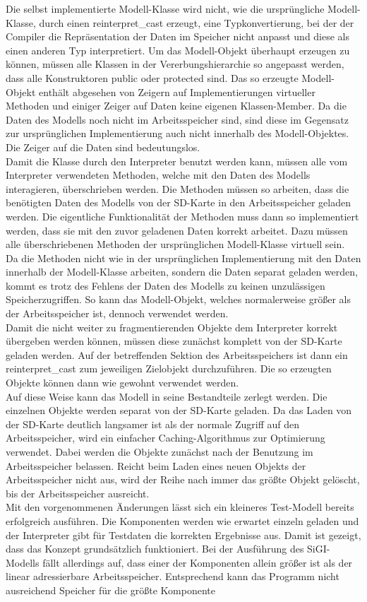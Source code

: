     Die selbst implementierte Modell-Klasse wird nicht, wie die ursprüngliche Modell-Klasse, durch einen reinterpret\_cast erzeugt, eine Typkonvertierung, bei der der Compiler die Repräsentation der Daten im Speicher nicht anpasst und diese als einen anderen Typ interpretiert. Um das Modell-Objekt überhaupt erzeugen zu können, müssen alle Klassen in der Vererbungshierarchie so angepasst werden, dass alle Konstruktoren public oder protected sind. Das so erzeugte Modell-Objekt enthält abgesehen von Zeigern auf Implementierungen virtueller Methoden und einiger Zeiger auf Daten keine eigenen Klassen-Member. Da die Daten des Modells noch nicht im Arbeitsspeicher sind, sind diese im Gegensatz zur ursprünglichen Implementierung auch nicht innerhalb des Modell-Objektes. Die Zeiger auf die Daten sind bedeutungslos.\\ Damit die Klasse durch den Interpreter benutzt werden kann, müssen alle vom Interpreter verwendeten Methoden, welche mit den Daten des Modells interagieren, überschrieben werden. Die Methoden müssen so arbeiten, dass die benötigten Daten des Modells von der SD-Karte in den Arbeitsspeicher geladen werden. Die eigentliche Funktionalität der Methoden muss dann so implementiert werden, dass sie mit den zuvor geladenen Daten korrekt arbeitet. Dazu müssen alle überschriebenen Methoden der ursprünglichen Modell-Klasse virtuell sein.\\ Da die Methoden nicht wie in der ursprünglichen Implementierung mit den Daten innerhalb der Modell-Klasse arbeiten, sondern die Daten separat geladen werden, kommt es trotz des Fehlens der Daten des Modells zu keinen unzulässigen Speicherzugriffen. So kann das Modell-Objekt, welches normalerweise größer als der Arbeitsspeicher ist, dennoch verwendet werden.\\ Damit die nicht weiter zu fragmentierenden Objekte dem Interpreter korrekt übergeben werden können, müssen diese zunächst komplett von der SD-Karte geladen werden. Auf der betreffenden Sektion des Arbeitsspeichers ist dann ein reinterpret\_cast zum jeweiligen Zielobjekt durchzuführen. Die so erzeugten Objekte können dann wie gewohnt verwendet werden.\\ Auf diese Weise kann das Modell in seine Bestandteile zerlegt werden. Die einzelnen Objekte werden separat von der SD-Karte geladen. Da das Laden von der SD-Karte deutlich langsamer ist als der normale Zugriff auf den Arbeitsspeicher, wird ein einfacher Caching-Algorithmus zur Optimierung verwendet. Dabei werden die Objekte zunächst nach der Benutzung im Arbeitsspeicher belassen. Reicht beim Laden eines neuen Objekts der Arbeitsspeicher nicht aus, wird der Reihe nach immer das größte Objekt gelöscht, bis der Arbeitsspeicher ausreicht.\\ Mit den vorgenommenen Änderungen lässt sich ein kleineres Test-Modell bereits erfolgreich ausführen. Die Komponenten werden wie erwartet einzeln geladen und der Interpreter gibt für Testdaten die korrekten Ergebnisse aus. Damit ist gezeigt, dass das Konzept grundsätzlich funktioniert. Bei der Ausführung des SiGI-Modells fällt allerdings auf, dass einer der Komponenten allein größer ist als der linear adressierbare Arbeitsspeicher. Entsprechend kann das Programm nicht ausreichend Speicher für die größte Komponente 